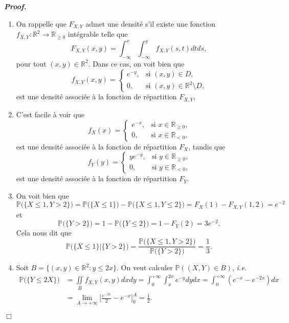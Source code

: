 \documentclass[11pt,a4paper]{article}
\newcommand{\RR}{\mathbb{R}}
\newenvironment{preuve}[1][]
{\vskip 2mm  \noindent\emph{\bf Proof#1. }}{$\Box$ \vskip 2mm}
\let\geq\geqslant
\let\leq\leqslant
\begin{document}
\begin{preuve}
\begin{enumerate}
				\item On rappelle que $F_{X,Y}$ admet une densité s'il existe une fonction $f_{X,Y} : \RR^{2} \rightarrow \RR_{\geq 0}$ 
				intégrable telle que
				\[     F_{X,Y}(x,y) = \int_{- \infty}^{x} \int_{- \infty}^{y} f_{X,Y}(s,t) dt ds,     \]
				pour tout $(x,y) \in \RR^{2}$.  
				Dans ce cas, on voit bien que 
				\[     f_{X,Y}(x,y)= \begin{cases} e^{-y} , &\text{si $(x,y) \in D$,} 
				\\
				0, &\text{si $(x,y) \in \RR^{2} \setminus D$,} 
				\end{cases}
				\] 
				est une densité associée à la fonction de répartition $F_{X,Y}$, 
				
				\item C'est facile à voir que 
				\[     f_{X}(x)= \begin{cases} e^{-x}, &\text{si $x \in \RR_{\geq 0}$,} 
				\\
				0, &\text{si $x \in \RR_{< 0}$,} 
				\end{cases}
				\] 
				est une densité associée à la fonction de répartition $F_{X}$, tandis que 
				\[     f_{Y}(y)= \begin{cases} y e^{-y}, &\text{si $y \in \RR_{\geq 0}$,} 
				\\
				0, &\text{si $y \in \RR_{< 0}$,} 
				\end{cases}
				\] 
				est une densité associée à la fonction de répartition $F_{Y}$. 
				
				\item On voit bien que 
				\[     \mathbb{P}\big(\{X \leq 1, Y>2\}\big) = \mathbb{P}\big(\{X \leq 1\}\big) - \mathbb{P}\big(\{X \leq 1, Y \leq 2\}\big) 
				= F_{X}(1) - F_{X,Y}(1,2) = e^{-2}      \]
				et 
				\[     \mathbb{P}\big(\{Y>2\}\big) = 1 - \mathbb{P}\big(\{Y \leq 2\}\big) = 1 - F_{Y}(2) = 3 e^{-2}.      \] 
				Cela nous dit que 
				\[     \mathbb{P}\big(\{X \leq 1 \} | \{ Y>2\}\big) = \frac{\mathbb{P}\big(\{X \leq 1, Y>2\}\big)}{\mathbb{P}\big(\{Y>2\}\big)} = \frac{1}{3}.     \]
				
				\item Soit $B = \{ (x,y) \in \RR^{2} : y \leq 2 x \}$. 
				On veut calculer $\mathbb{P}((X,Y) \in B)$, \textit{i.e.} 
				\begin{align*}
				\mathbb{P}\big(\{Y \leq 2 X \}\big) &= \underset{B}{\iint} f_{X,Y}(x,y) dx dy  = \int_{0}^{+ \infty} \int_{x}^{2x} e^{-y} dy dx = \int_{0}^{+ \infty} (e^{-x} - e^{-2x}) dx 
				\\
				&= \underset{A \rightarrow + \infty}{\lim} \bigg[ \frac{e^{-2 x}}{2} -e^{-x} \bigg]_{0}^{A} = \frac{1}{2}.    
				\end{align*}      
			\end{enumerate}
		\end{preuve}  
		
\end{document}
